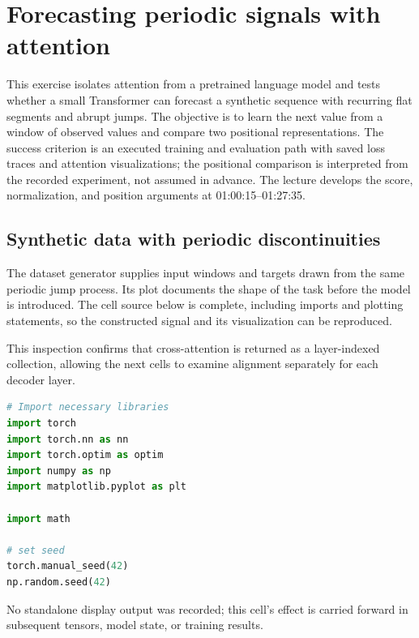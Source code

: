 \documentclass[../labs.tex]{subfiles}
\begin{document}
\chapter{Forecasting periodic signals with attention}

\label{ch:lab02_time_series}

This exercise isolates attention from a pretrained language model and tests whether a small Transformer can forecast a synthetic sequence with recurring flat segments and abrupt jumps. The objective is to learn the next value from a window of observed values and compare two positional representations. The success criterion is an executed training and evaluation path with saved loss traces and attention visualizations; the positional comparison is interpreted from the recorded experiment, not assumed in advance. The lecture develops the score, normalization, and position arguments at 01:00:15--01:27:35.

\section{Synthetic data with periodic discontinuities}

The dataset generator supplies input windows and targets drawn from the same periodic jump process. Its plot documents the shape of the task before the model is introduced. The cell source below is complete, including imports and plotting statements, so the constructed signal and its visualization can be reproduced.



\noindent This inspection confirms that cross-attention is returned as a layer-indexed collection, allowing the next cells to examine alignment separately for each decoder layer.

\begin{lstlisting}[language=Python,basicstyle=\ttfamily\scriptsize,breaklines=true,breakatwhitespace=false,columns=fullflexible,keepspaces=true,numbers=none]
# Import necessary libraries
import torch
import torch.nn as nn
import torch.optim as optim
import numpy as np
import matplotlib.pyplot as plt

import math

# set seed 
torch.manual_seed(42)
np.random.seed(42)
\end{lstlisting}

\hypertarget{res:lab02-text-02-attention-ipynb-0-16bcf3930476}{}\noindent No standalone display output was recorded; this cell’s effect is carried forward in subsequent tensors, model state, or training results.
\end{document}
